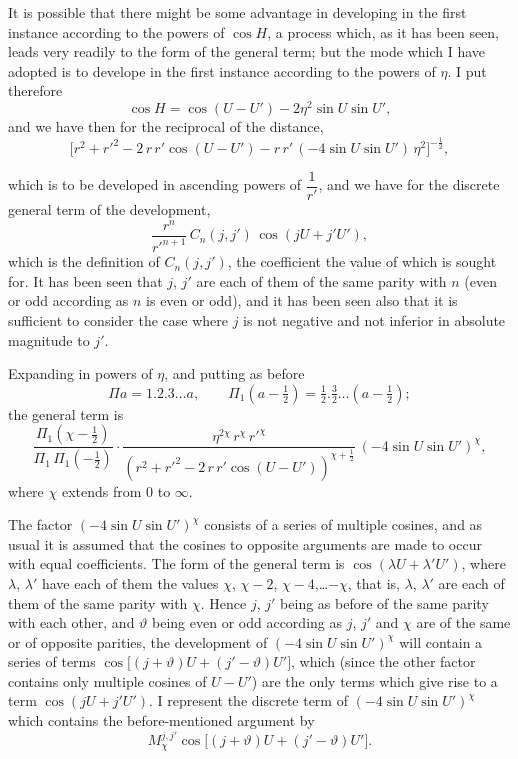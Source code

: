 \documentclass[12pt,a4paper]{article}
\theoremstyle{plain}
\begin{document}
\medskip
It is possible that there might be some advantage in developing in the first instance according to the powers of $\cos H$, a process which, as it has been seen, leads very readily to the form of the general term; but the mode which I have adopted is to develope in the first instance according to the powers of $\eta$. I put therefore
\[
\cos H=\cos(U-U')-2\eta^{2}\sin U\sin U',
\]
and we have then for the reciprocal of the distance,
\[
\bigl[r^{2}+r'^{2}-2\,r\,r'\cos(U-U')-r\,r'\,(-4\sin U\sin U')\,\eta^{2}\bigr]^{-\tfrac{1}{2}},
\]

\newpage
{} which is to be developed in ascending powers of $\dfrac{1}{r'}$, and we have for the discrete general term of the development,
\[
\dfrac{r^{n}}{r'^{n+1}}\,C_{n}(j,j')\,\cos(jU+j'U'),
\]
which is the definition of $C_{n}(j,j')$, the coefficient the value of which is sought for. It has been seen that $j$, $j'$ are each of them of the same parity with $n$ (even or odd according as $n$ is even or odd), and it has been seen also that it is sufficient to consider the case where $j$ is not negative and not inferior in absolute magnitude to $j'$.

\medskip
Expanding in powers of $\eta$, and putting as before
\[
\Pi a=1.2.3\ldots a,\qquad \Pi_{1}(a-\tfrac{1}{2})=\tfrac{1}{2}.\tfrac{3}{2}\ldots(a-\tfrac{1}{2});
\]
the general term is
\[
\dfrac{\Pi_{1}(\chi-\tfrac{1}{2})}{\Pi_{1}\,\Pi_{1}(-\tfrac{1}{2})}\cdot\dfrac{\eta^{2\chi}\,r^{\chi}\,r'^{\chi}}{(r^{2}+r'^{2}-2\,r\,r'\cos(U-U'))^{\chi+\tfrac{1}{2}}}\,(-4\sin U\sin U')^{\chi},
\]
where $\chi$ extends from $0$ to $\infty$.

\medskip
The factor $(-4\sin U\sin U')^{\chi}$ consists of a series of multiple cosines, and as usual it is assumed that the cosines to opposite arguments are made to occur with equal coefficients. The form of the general term is $\cos(\lambda U+\lambda'U')$, where $\lambda$, $\lambda'$ have each of them the values $\chi$, $\chi-2$, $\chi-4$,\ldots$-\chi$, that is, $\lambda$, $\lambda'$ are each of them of the same parity with $\chi$. Hence $j$, $j'$ being as before of the same parity with each other, and $\vartheta$ being even or odd according as $j$, $j'$ and $\chi$ are of the same or of opposite parities, the development of $(-4\sin U\sin U')^{\chi}$ will contain a series of terms $\cos\bigl[(j+\vartheta)U+(j'-\vartheta)U'\bigr]$, which (since the other factor contains only multiple cosines of $U-U'$) are the only terms which give rise to a term $\cos(jU+j'U')$. I represent the discrete term of $(-4\sin U\sin U')^{\chi}$ which contains the before-mentioned argument by
\[
M_{\chi}^{j,j'}\cos\bigl[(j+\vartheta)U+(j'-\vartheta)U'\bigr].
\]
\end{document}
